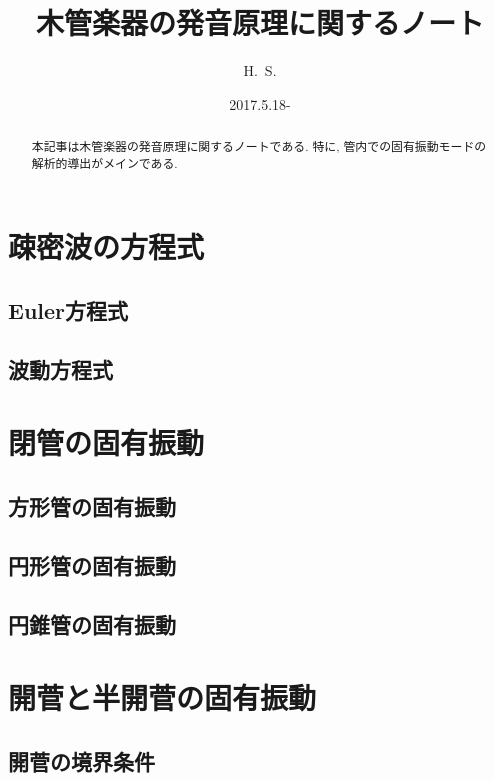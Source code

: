 \documentclass[a4paper]{ltjsarticle}
\title{木管楽器の発音原理に関するノート}
\author{H.~S.}
\date{2017.5.18-}
\begin{document}
\maketitle
\thispagestyle{fancy}

\begin{abstract}
	本記事は木管楽器の発音原理に関するノートである.
	特に, 管内での固有振動モードの解析的導出がメインである.
\end{abstract}

\tableofcontents

\section{疎密波の方程式}

\subsection{Euler方程式}

\subsection{波動方程式}


\section{閉管の固有振動}

\subsection{方形管の固有振動}

\subsection{円形管の固有振動}

\subsection{円錐管の固有振動}


\section{開菅と半開菅の固有振動}

\subsection{開菅の境界条件}
\end{document}
